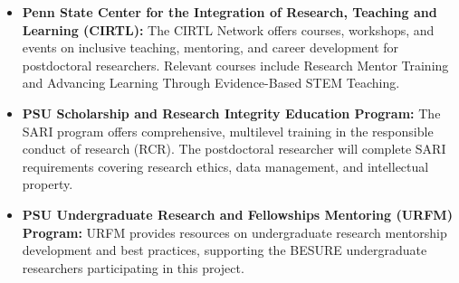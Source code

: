 \documentclass[11pt]{article}
\begin{document}
\begin{itemize}
\item \textbf{Penn State Center for the Integration of Research, Teaching and Learning (CIRTL):}
The CIRTL Network offers courses, workshops, and events on inclusive teaching, mentoring, and career development for postdoctoral researchers. Relevant courses include Research Mentor Training and Advancing Learning Through Evidence-Based STEM Teaching.

\item \textbf{PSU Scholarship and Research Integrity Education Program:}
The SARI program offers comprehensive, multilevel training in the responsible conduct of research (RCR). The postdoctoral researcher will complete SARI requirements covering research ethics, data management, and intellectual property.

\item \textbf{PSU Undergraduate Research and Fellowships Mentoring (URFM) Program:}
URFM provides resources on undergraduate research mentorship development and best practices, supporting the BESURE undergraduate researchers participating in this project.

\end{itemize}
\end{document}

